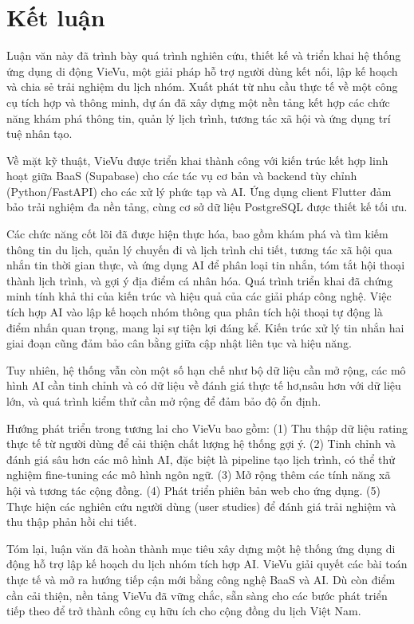 \chapter*{Kết luận}

\noindent Luận văn này đã trình bày quá trình nghiên cứu, thiết kế và triển khai hệ thống ứng dụng di động VieVu, một giải pháp hỗ trợ người dùng kết nối, lập kế hoạch và chia sẻ trải nghiệm du lịch nhóm. Xuất phát từ nhu cầu thực tế về một công cụ tích hợp và thông minh, dự án đã xây dựng một nền tảng kết hợp các chức năng khám phá thông tin, quản lý lịch trình, tương tác xã hội và ứng dụng trí tuệ nhân tạo.

Về mặt kỹ thuật, VieVu được triển khai thành công với kiến trúc kết hợp linh hoạt giữa BaaS (Supabase) cho các tác vụ cơ bản và backend tùy chỉnh (Python/FastAPI) cho các xử lý phức tạp và AI. Ứng dụng client Flutter đảm bảo trải nghiệm đa nền tảng, cùng cơ sở dữ liệu PostgreSQL được thiết kế tối ưu.

Các chức năng cốt lõi đã được hiện thực hóa, bao gồm khám phá và tìm kiếm thông tin du lịch, quản lý chuyến đi và lịch trình chi tiết, tương tác xã hội qua nhắn tin thời gian thực, và ứng dụng AI để phân loại tin nhắn, tóm tắt hội thoại thành lịch trình, và gợi ý địa điểm cá nhân hóa. Quá trình triển khai đã chứng minh tính khả thi của kiến trúc và hiệu quả của các giải pháp công nghệ. Việc tích hợp AI vào lập kế hoạch nhóm thông qua phân tích hội thoại tự động là điểm nhấn quan trọng, mang lại sự tiện lợi đáng kể. Kiến trúc xử lý tin nhắn hai giai đoạn cũng đảm bảo cân bằng giữa cập nhật liên tục và hiệu năng.

Tuy nhiên, hệ thống vẫn còn một số hạn chế như bộ dữ liệu cần mở rộng, các mô hình AI cần tinh chỉnh và có dữ liệu về đánh giá thực tế hơ,nsâu hơn với dữ liệu lớn, và quá trình kiểm thử cần mở rộng để đảm bảo độ ổn định.

Hướng phát triển trong tương lai cho VieVu bao gồm: (1) Thu thập dữ liệu rating thực tế từ người dùng để cải thiện chất lượng hệ thống gợi ý. (2) Tinh chỉnh và đánh giá sâu hơn các mô hình AI, đặc biệt là pipeline tạo lịch trình, có thể thử nghiệm fine-tuning các mô hình ngôn ngữ. (3) Mở rộng thêm các tính năng xã hội và tương tác cộng đồng. (4) Phát triển phiên bản web cho ứng dụng. (5) Thực hiện các nghiên cứu người dùng (user studies) để đánh giá trải nghiệm và thu thập phản hồi chi tiết.

Tóm lại, luận văn đã hoàn thành mục tiêu xây dựng một hệ thống ứng dụng di động hỗ trợ lập kế hoạch du lịch nhóm tích hợp AI. VieVu giải quyết các bài toán thực tế và mở ra hướng tiếp cận mới bằng công nghệ BaaS và AI. Dù còn điểm cần cải thiện, nền tảng VieVu đã vững chắc, sẵn sàng cho các bước phát triển tiếp theo để trở thành công cụ hữu ích cho cộng đồng du lịch Việt Nam.